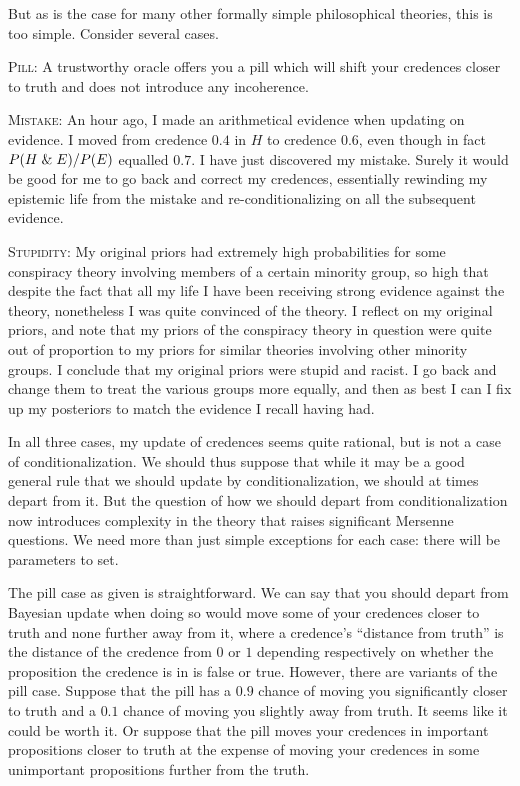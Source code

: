 But as is the case for many other formally simple philosophical theories, this is too
simple. Consider several cases. 

\textsc{Pill:} A trustworthy oracle offers you a pill which will shift your credences closer to truth and does not introduce 
any incoherence. 

\textsc{Mistake:} An hour ago, I made an arithmetical evidence when updating on evidence. I moved from credence $0.4$ in $H$ to
credence $0.6$, even though in fact $P(H\mathrel{\&} E)/P(E)$ equalled $0.7$. I have just discovered my mistake. Surely it would be good
for me to go back and correct my credences, essentially rewinding my epistemic life from the mistake and re-conditionalizing on all
the subsequent evidence. 

\textsc{Stupidity:} My original priors had extremely high probabilities for some conspiracy theory involving members of a certain 
minority group, so high that despite the fact that all my life I have been receiving strong evidence against the theory, nonetheless I 
was quite convinced of the theory. I reflect on my original priors, and note that my priors of the conspiracy theory in question were 
quite out of proportion to my priors for similar theories involving other minority groups. I conclude that my original priors were
stupid and racist. I go back and change them to treat the various groups more equally, and then as best I can I fix up my posteriors
to match the evidence I recall having had. 

In all three cases, my update of credences seems quite rational, but is not a case of conditionalization. We should thus
suppose that while it may be a good general rule that we should update by conditionalization, we should at times depart from it.
But the question of how we should depart from conditionalization now introduces complexity in the theory that raises significant
Mersenne questions. We need more than just simple exceptions for each case: there will be parameters to set.

The pill case as given is straightforward. We can say that you should depart from Bayesian update when doing so would move
some of your credences closer to truth and none further away from it, where a credence's ``distance from truth'' is the 
distance of the credence from $0$ or $1$ depending respectively on whether the proposition the credence is in is false or
true. However, there are variants of the pill case. Suppose that the pill has a $0.9$ chance of moving you significantly
closer to truth and a $0.1$ chance of moving you slightly away from truth. It seems like it could be worth it. Or suppose
that the pill moves your credences in important propositions closer to truth at the expense of moving your credences in some
unimportant propositions further from the truth.

